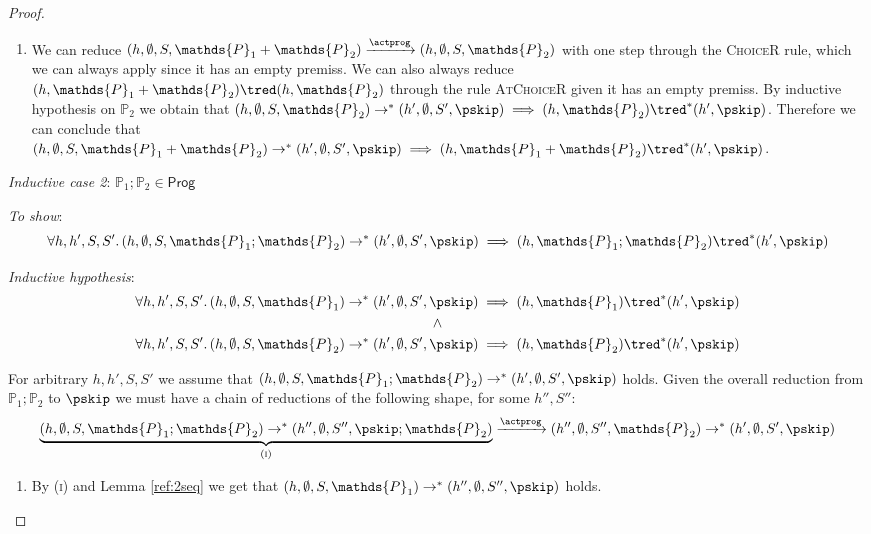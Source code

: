 \begin{thm}
{\begin{proof}
\begin{enumerate}
	\item We can reduce $(h, \emptyset, S, \mathds{P}_1 + \mathds{P}_2) \xrightarrow{\actprog} (h, \emptyset, S, \mathds{P}_2)$ with one step through the \textsc{ChoiceR} rule, which we can always apply since it has an empty premiss. We can also always reduce $(h, \mathds{P}_1 + \mathds{P}_2) \tred (h, \mathds{P}_2)$ through the rule \textsc{AtChoiceR} given it has an empty premiss. By inductive hypothesis on $\mathds{P}_2$ we obtain that $(h, \emptyset, S, \mathds{P}_2) \rightarrow^* (h', \emptyset, S', \pskip) \implies (h, \mathds{P}_2) \tred^* (h', \pskip)$. Therefore we can conclude that $(h, \emptyset, S, \mathds{P}_1 + \mathds{P}_2) \rightarrow^* (h', \emptyset, S', \pskip) \implies  (h, \mathds{P}_1 + \mathds{P}_2) \tred^* (h', \pskip)$. \\
\end{enumerate}

\textit{Inductive case 2}: $\mathds{P}_1 ; \mathds{P}_2 \in \mathsf{Prog}$

\textit{To show}:
\[
	\forall h, h', S, S' \ldotp
	(h, \emptyset, S, \mathds{P}_1 ; \mathds{P}_2) \rightarrow^* (h', \emptyset, S', \pskip) \implies 
	(h, \mathds{P}_1 ; \mathds{P}_2 ) \tred^* (h', \pskip)
\]

\textit{Inductive hypothesis}:
\begin{gather*}
	\forall h, h', S, S' \ldotp
	(h, \emptyset, S, \mathds{P}_1) \rightarrow^* (h', \emptyset, S', \pskip) \implies 
	(h, \mathds{P}_1) \tred^* (h', \pskip)
	\\ \land \\
	\forall h, h', S, S' \ldotp
	(h, \emptyset, S, \mathds{P}_2) \rightarrow^* (h', \emptyset, S', \pskip) \implies 
	(h, \mathds{P}_2) \tred^* (h', \pskip)
\end{gather*}

For arbitrary $h, h', S, S'$ we assume that $(h, \emptyset, S, \mathds{P}_1 ; \mathds{P}_2) \rightarrow^* (h', \emptyset, S', \pskip)$ holds. Given the overall reduction from $\mathds{P}_1 ; \mathds{P}_2$ to $\pskip$ we must have a chain of reductions of the following shape, for some $h'', S''$: \iffalse where $\Phi'' = \emptyset$ by Lemma \ref{ref:phiemp}. \fi
\[
	\underbrace{(h, \emptyset, S, \mathds{P}_1 ; \mathds{P}_2) \rightarrow^* (h'', \emptyset, S'', \pskip; \mathds{P}_2)}_{(\textsc{i})}
	\xrightarrow{\actprog} (h'', \emptyset, S'', \mathds{P}_2) \rightarrow^* (h', \emptyset, S', \pskip)
\]
\begin{enumerate}
	\item \label{seq:1} By (\textsc{i}) and Lemma \ref{ref:2seq} we get that $(h, \emptyset, S, \mathds{P}_1) \rightarrow^* (h'', \emptyset, S'', \pskip)$ holds.
	

\end{enumerate}
\end{proof}}
\end{thm}
